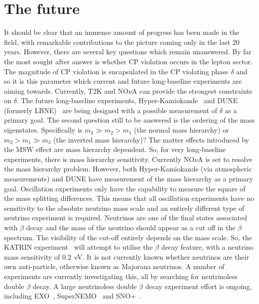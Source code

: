\section{The future}
\label{sec:NeutrinoFieldFuture}
It should be clear that an immense amount of progress has been made in the field, with remarkable contributions to the picture coming only in the last 20 years.  However, there are several key questions which remain unanswered.  
\newline
\newline
By far the most sought after answer is whether CP violation occurs in the lepton sector.  The magnitude of CP violation is encapsulated in the CP violating phase $\delta$ and so it is this parameter which current and future long-baseline experiments are aiming towards.  Currently, T2K and NO$\nu$A can provide the strongest constraints on $\delta$.  The future long-baseline experiments, Hyper-Kamiokande~\cite{Abe:2014oxa} and DUNE (formerly LBNE)~\cite{Adams:2013qkq} are being designed with a possible measurement of $\delta$ as a primary goal.
\newline
\newline
The second question still to be answered is the ordering of the mass eigenstates.  Specifically is $m_3 \gg m_2 > m_1$ (the normal mass hierarchy) or $m_2 > m_1 \gg m_3$ (the inverted mass hierarchy)?  The matter effects introduced by the MSW effect are mass hierarchy dependent.  So, for very long-baseline experiments, there is mass hierarchy sensitivity.  Currently NO$\nu$A is set to resolve the mass hierarchy problem.  However, both Hyper-Kamiokande (via atmospheric measurements) and DUNE have measurement of the mass hierarchy as a primary goal.
\newline
\newline
Oscillation experiments only have the capability to measure the square of the mass splitting differences.  This means that all oscillation experiments have no sensitivity to the absolute neutrino mass scale and an entirely different type of neutrino experiment is required.  Neutrinos are one of the final states associated with $\beta$ decay and the mass of the neutrino should appear as a cut off in the $\beta$ spectrum.  The visibility of the cut-off entirely depends on the mass scale.  So, the KATRIN experiment~\cite{Weinheimer2002141} will attempt to utilise the $\beta$ decay feature, with a neutrino mass sensitivity of $0.2$~eV.
\newline
\newline
It is not currently known whether neutrinos are their own anti-particle, otherwise known as Majorana neutrinos.  A number of experiments are currently investigating this, all by searching for neutrinoless double $\beta$ decay.  A large neutrinoless double $\beta$ decay experiment effort is ongoing, including EXO~\cite{PhysRevLett.109.032505}, SuperNEMO~\cite{1742-6596-375-4-042012} and SNO+~\cite{Chen:2008un}.
